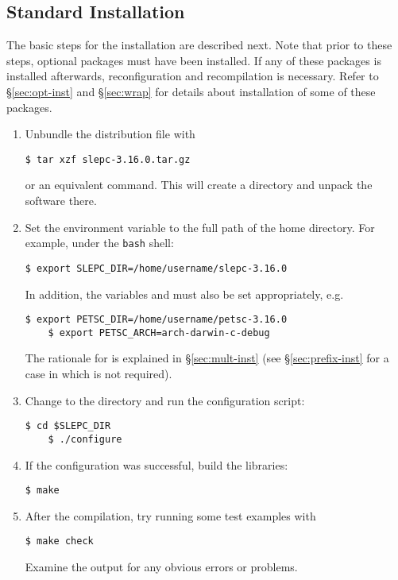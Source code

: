 \subsection{Standard Installation}
\label{sec:std-inst}

	The basic steps for the installation are described next. Note that prior to these steps, optional packages must have been installed. If any of these packages is installed afterwards, reconfiguration and recompilation is necessary. Refer to \S\ref{sec:opt-inst} and \S\ref{sec:wrap} for details about installation of some of these packages.

\begin{enumerate}
	\item Unbundle the distribution file with
	\begin{Verbatim}[fontsize=\small]
	$ tar xzf slepc-3.16.0.tar.gz
	\end{Verbatim}
        or an equivalent command. This will create a directory and unpack the software there.
	\item Set the environment variable  to the full path of the \slepc home directory. For example, under the \texttt{bash} shell:
	\begin{Verbatim}[fontsize=\small]
	$ export SLEPC_DIR=/home/username/slepc-3.16.0
	\end{Verbatim}
	In addition, the variables  and  must also be set appropriately, e.g.
	\begin{Verbatim}[fontsize=\small]
	$ export PETSC_DIR=/home/username/petsc-3.16.0
	$ export PETSC_ARCH=arch-darwin-c-debug
	\end{Verbatim}
        The rationale for  is explained in \S\ref{sec:mult-inst} (see \S\ref{sec:prefix-inst} for a case in which  is not required).
	\item\label{step-config} Change to the \slepc directory and run the configuration script:
	\begin{Verbatim}[fontsize=\small]
	$ cd $SLEPC_DIR
	$ ./configure
	\end{Verbatim}
	\item If the configuration was successful, build the libraries:
	\begin{Verbatim}[fontsize=\small]
	$ make
	\end{Verbatim}
	\item After the compilation, try running some test examples with
	\begin{Verbatim}[fontsize=\small]
	$ make check
	\end{Verbatim}
        Examine the output for any obvious errors or problems.
\end{enumerate}
	
